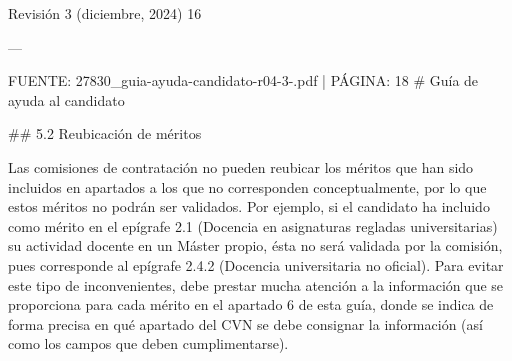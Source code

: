 \documentclass{article}
\begin{document}
\begin{itemize}
\begin{itemize}
\begin{scriptsize}
                  Revisión 3 (diciembre, 2024) 16

                  ---

                  FUENTE: 27830\_guia-ayuda-candidato-r04-3-.pdf | PÁGINA: 18
                  \# Guía de ayuda al candidato

                  \#\# 5.2 Reubicación de méritos

                  Las comisiones de contratación no pueden reubicar los méritos que han sido incluidos en apartados a los que no corresponden conceptualmente, por lo que estos méritos no podrán ser validados. Por ejemplo, si el candidato ha incluido como mérito en el epígrafe 2.1 (Docencia en asignaturas regladas universitarias) su actividad docente en un Máster propio, ésta no será validada por la comisión, pues corresponde al epígrafe 2.4.2 (Docencia universitaria no oficial). Para evitar este tipo de inconvenientes, debe prestar mucha atención a la información que se proporciona para cada mérito en el apartado 6 de esta guía, donde se indica de forma precisa en qué apartado del CVN se debe consignar la información (así como los campos que deben cumplimentarse).


\end{scriptsize}
\end{itemize}
\end{itemize}
\end{document}
